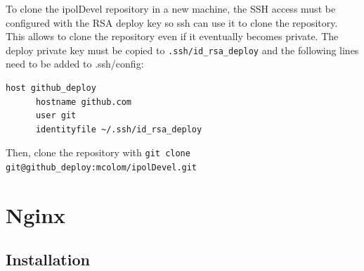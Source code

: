 \documentclass[a4paper,12pt]{article}
\begin{document}

To clone the ipolDevel repository in a new machine, the SSH access must be configured with the RSA deploy key so ssh can use it to clone the repository. This allows to clone the repository even if it eventually becomes private.
%
The deploy private key must be copied to {\tt .ssh/id\_rsa\_deploy} and the following lines need to be added to .ssh/config:

\begin{verbatim}
host github_deploy
      hostname github.com
      user git
      identityfile ~/.ssh/id_rsa_deploy
\end{verbatim}

Then, clone the repository with {\tt git clone git@github\_deploy:mcolom/ipolDevel.git}

\section{Nginx}

\subsection{Installation}
\end{document}
